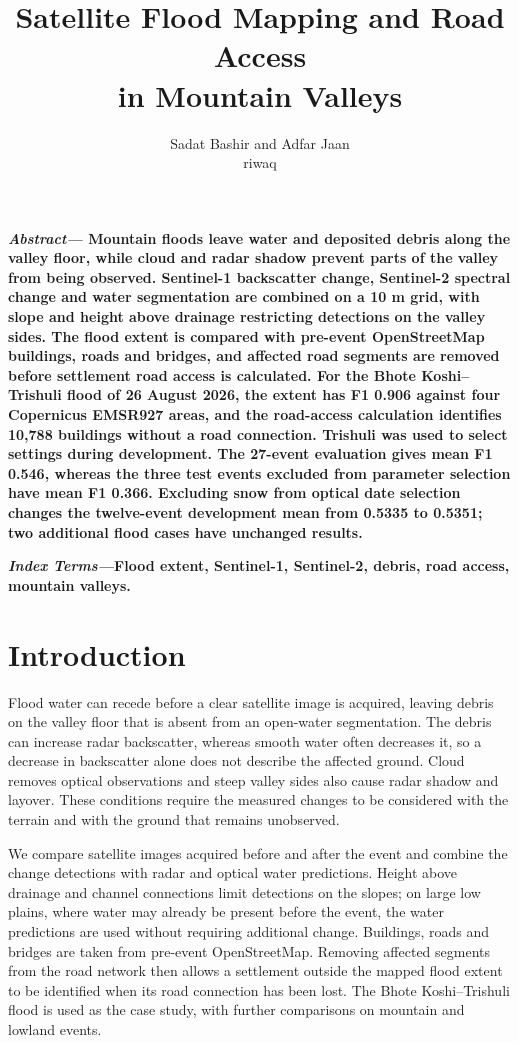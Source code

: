 \documentclass[10pt,twocolumn,letterpaper]{article}
\title{\normalfont\sffamily\fontsize{24}{28}\selectfont\color{PaperInk}
  Satellite Flood Mapping and Road Access\\in Mountain Valleys}
\author{\sffamily Sadat Bashir and Adfar Jaan\\[3pt]\sffamily\small riwaq}
\date{}
\renewenvironment{abstract}{\par\noindent\begingroup\sffamily\bfseries
  \fontsize{9}{10.5}\selectfont\textcolor{PaperInk}{\itshape Abstract---}}
  {\par\endgroup\vspace{8pt}}
\begin{document}
\maketitle
\thispagestyle{fancy}
\begin{abstract}
Mountain floods leave water and deposited debris along the valley floor, while cloud and radar
shadow prevent parts of the valley from being observed. Sentinel-1 backscatter change, Sentinel-2
spectral change and water segmentation are combined on a 10 m grid, with slope and height above
drainage restricting detections on the valley sides. The flood extent is compared with pre-event
OpenStreetMap buildings, roads and bridges, and affected road segments are removed before settlement
road access is calculated. For the Bhote Koshi--Trishuli flood of 26 August 2026, the extent has F1
0.906 against four Copernicus EMSR927 areas, and the road-access calculation identifies 10,788
buildings without a road connection. Trishuli was used to select settings during development. The
27-event evaluation gives mean F1 0.546, whereas the three test events excluded from parameter
selection have mean F1 0.366. Excluding snow from optical date selection changes the
twelve-event development mean from 0.5335 to 0.5351; two additional flood cases have unchanged
results.
\end{abstract}

{\noindent\sffamily\bfseries\fontsize{9}{10.5}\selectfont
\textcolor{PaperInk}{\itshape Index Terms---}Flood extent, Sentinel-1, Sentinel-2, debris,
road access, mountain valleys.\par}

\section{Introduction}
Flood water can recede before a clear satellite image is acquired, leaving debris on the valley
floor that is absent from an open-water segmentation. The debris can increase radar backscatter,
whereas smooth water often decreases it, so a decrease in backscatter alone does not describe the
affected ground. Cloud removes optical observations and steep valley sides also cause radar shadow
and layover. These conditions require the measured changes to be considered with the terrain and
with the ground that remains unobserved.

We compare satellite images acquired before and after the event and combine the change detections
with radar and optical water predictions. Height above drainage and channel connections limit
detections on the slopes; on large low plains, where water may already be present before the event,
the water predictions are used without requiring additional change. Buildings, roads and bridges are
taken from pre-event OpenStreetMap. Removing affected segments from the road network then allows a
settlement outside the mapped flood extent to be identified when its road connection has been lost.
The Bhote Koshi--Trishuli flood is used as the case study, with further comparisons on mountain and
lowland events.
\end{document}

